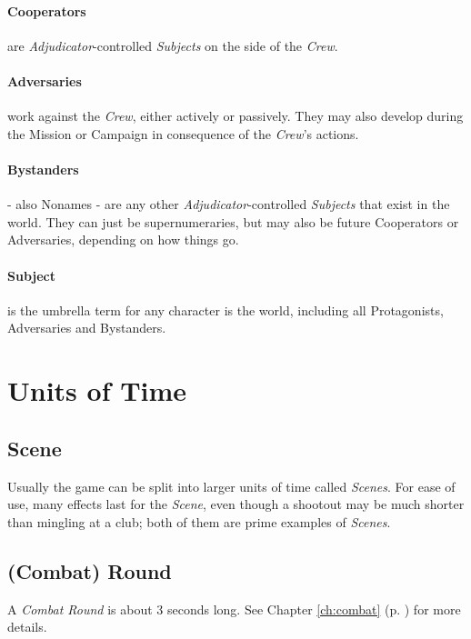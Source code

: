 \documentclass[11pt,a4paper,openany,dvipsnames]{book}
\begin{document}
	\paragraph{Cooperators}
			are \emph{Adjudicator}-controlled \emph{Subjects} on the side of the \emph{Crew}.
	\paragraph{Adversaries}
			work against the \emph{Crew}, either actively or passively.
		They may also develop during the Mission or Campaign in consequence of the \emph{Crew}'s actions.
	\paragraph{Bystanders}
			- also Nonames -
			are any other \emph{Adjudicator}-controlled \emph{Subjects} that exist in the world.
		They can just be supernumeraries, but may also be future Cooperators or Adversaries, depending on how things go.
	\paragraph{Subject}
			is the umbrella term for any character is the world,
		including all Protagonists, Adversaries and Bystanders.
	
	\section{Units of Time}
	\subsection*{Scene}
	Usually the game can be split into larger units of time called \emph{Scenes}.
	For ease of use, many effects last for the \emph{Scene},
		even though a shootout may be much shorter than mingling at a club;
		both of them are prime examples of \emph{Scenes}.
	\subsection*{(Combat) Round}
	A \emph{Combat Round} is about 3 seconds long.
	See Chapter \ref{ch:combat} (p. \pageref{ch:combat}) for more details.
\end{document}
